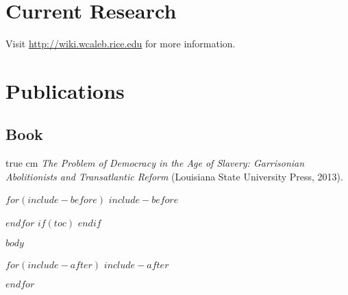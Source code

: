 \documentclass[12pt]{article}
\def\ind{\hangindent=1 true cm\hangafter=1 \noindent}
\begin{document}
\section{Current Research}


\indent Visit \url{http://wiki.wcaleb.rice.edu} for more information.

\section{Publications}

\subsection{Book}

\ind \emph{The Problem of Democracy in the Age of Slavery: Garrisonian Abolitionists and Transatlantic Reform} (Louisiana State University Press, 2013).

$for(include-before)$
$include-before$

$endfor$
$if(toc)$
\tableofcontents
$endif$

$body$

$for(include-after)$
$include-after$

$endfor$
\end{document}
